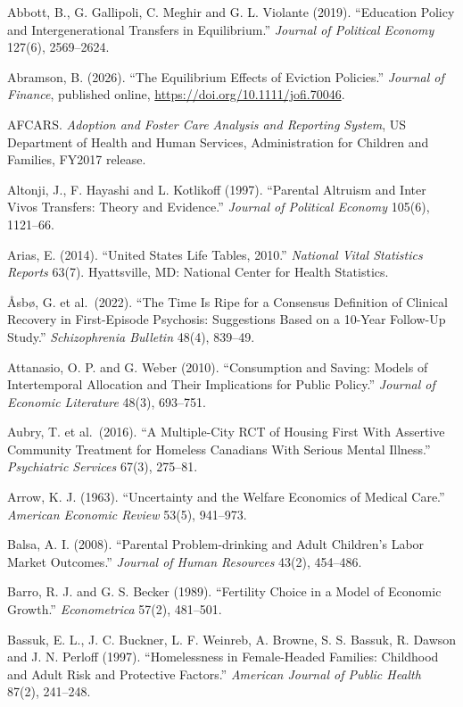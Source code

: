 \documentclass[10pt]{article}
\begin{document}
{\normalsize
\setlength{\parindent}{0em}
\begin{list}{}{\setlength{\leftmargin}{1.5em}\setlength{\itemindent}{-1.5em}\setlength{\itemsep}{0.35em}\setlength{\parsep}{0em}}
\item Abbott, B., G. Gallipoli, C. Meghir and G. L. Violante (2019). ``Education Policy and Intergenerational Transfers in Equilibrium.'' \emph{Journal of Political Economy} 127(6), 2569--2624.
\item Abramson, B. (2026). ``The Equilibrium Effects of Eviction Policies.'' \emph{Journal of Finance}, published online, \url{https://doi.org/10.1111/jofi.70046}.
\item AFCARS. \emph{Adoption and Foster Care Analysis and Reporting System}, US Department of Health and Human Services, Administration for Children and Families, FY2017 release.
\item Altonji, J., F. Hayashi and L. Kotlikoff (1997). ``Parental Altruism and Inter Vivos Transfers: Theory and Evidence.'' \emph{Journal of Political Economy} 105(6), 1121--66.
\item Arias, E. (2014). ``United States Life Tables, 2010.'' \emph{National Vital Statistics Reports} 63(7). Hyattsville, MD: National Center for Health Statistics.
\item {\AA}sb{\o}, G. et al.\ (2022). ``The Time Is Ripe for a Consensus Definition of Clinical Recovery in First-Episode Psychosis: Suggestions Based on a 10-Year Follow-Up Study.'' \emph{Schizophrenia Bulletin} 48(4), 839--49.
\item Attanasio, O. P. and G. Weber (2010). ``Consumption and Saving: Models of Intertemporal Allocation and Their Implications for Public Policy.'' \emph{Journal of Economic Literature} 48(3), 693--751.
\item Aubry, T. et al.\ (2016). ``A Multiple-City RCT of Housing First With Assertive Community Treatment for Homeless Canadians With Serious Mental Illness.'' \emph{Psychiatric Services} 67(3), 275--81.
\item Arrow, K. J. (1963). ``Uncertainty and the Welfare Economics of Medical Care.'' \emph{American Economic Review} 53(5), 941--973.
\item Balsa, A. I. (2008). ``Parental Problem-drinking and Adult Children's Labor Market Outcomes.'' \emph{Journal of Human Resources} 43(2), 454--486.
\item Barro, R. J. and G. S. Becker (1989). ``Fertility Choice in a Model of Economic Growth.'' \emph{Econometrica} 57(2), 481--501.
\item Bassuk, E. L., J. C. Buckner, L. F. Weinreb, A. Browne, S. S. Bassuk, R. Dawson and J. N. Perloff (1997). ``Homelessness in Female-Headed Families: Childhood and Adult Risk and Protective Factors.'' \emph{American Journal of Public Health} 87(2), 241--248.

\end{list}}
\end{document}
